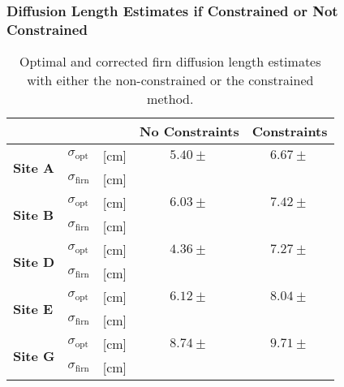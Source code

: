 \documentclass[../../CompleteThesis2/Complete_2ndDraft]{subfiles}
\begin{document}
\subsubsection[$\sigma$ Constraints or No constraints]{Diffusion Length Estimates if Constrained or Not Constrained}
\label{Subsubsec:Results_DiffLenEst_AlphabetCores_ConstraintsVNoConstraints}
\begin{table}[ht]
	\centering
	\begin{tabular}{l l l | c | c}
		& & & No Constraints & Constraints\\
		\hline
		\hline 
		\multirow{2}{*}{\textbf{Site A}} & $\sigma_{\text{opt}}$ & [cm] & $5.40 \pm$ & $6.67 \pm $\\
		& $\sigma_{\text{firn}}$ & [cm] & & \\
		\hline
		
		\multirow{2}{*}{\textbf{Site B}} & $\sigma_{\text{opt}}$ & [cm] & $6.03 \pm $ & $7.42 \pm $ \\
		& $\sigma_{\text{firn}}$ & [cm] & & \\
		\hline
		
		\multirow{2}{*}{\textbf{Site D}} & $\sigma_{\text{opt}}$ & [cm] & $4.36 \pm $ & $7.27 \pm $ \\
		& $\sigma_{\text{firn}}$ & [cm] & & \\
		\hline
		
		\multirow{2}{*}{\textbf{Site E}} & $\sigma_{\text{opt}}$ & [cm] & $6.12 \pm $ & $8.04 \pm $ \\
		& $\sigma_{\text{firn}}$ & [cm] & & \\
		\hline
		
		\multirow{2}{*}{\textbf{Site G}} & $\sigma_{\text{opt}}$ & [cm] & $8.74 \pm $ & $9.71 \pm $ \\
		& $\sigma_{\text{firn}}$ & [cm] & & \\
		
		\hline
	\end{tabular}
	\caption[$\sigma$ Estimates Given Unconstrained and Constrained Method]{\small Optimal and corrected firn diffusion length estimates with either the non-constrained or the constrained method.}
\end{table}
\end{document}
